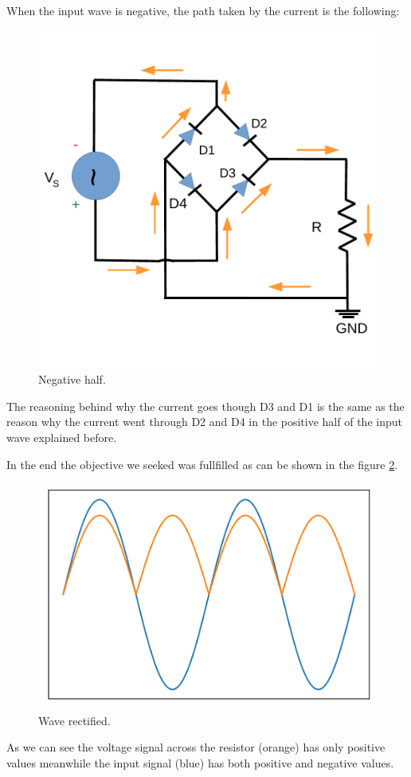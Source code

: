 When the input wave is negative, the path taken by the current is the following:
\begin{figure}[h] \centering
    \includegraphics[scale=0.42]{lab3 _negative.pdf}
    \caption{Negative half.}
    \label{fig:rc3}
\end{figure}

The reasoning behind why the current goes though D3 and D1 is the same as
the reason why the current went through D2 and D4 in the positive half of the input wave explained before.

In the end the objective we seeked was fullfilled as can be shown in the figure \ref{fig:rc4}.
\begin{figure}[h] \centering
    \includegraphics[scale=0.8]{rectwave.png}
    \caption{Wave rectified.}
    \label{fig:rc4}
\end{figure}
As we can see the voltage signal across the resistor (orange) has only positive values
meanwhile the input signal (blue) has both positive and negative values.

